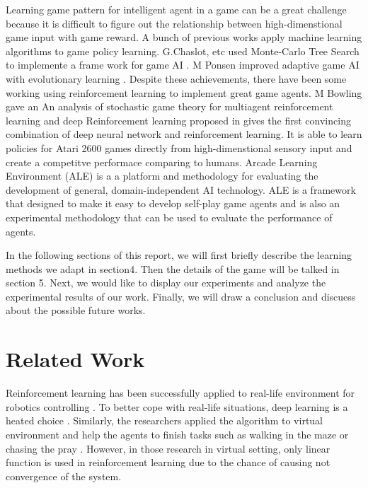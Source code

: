 \documentclass{acmsiggraph}
\begin{document}
Learning game pattern for intelligent agent in a game can be a great challenge because it is difficult to figure out the relationship between high-dimenstional game input with game reward. A bunch of previous works apply machine learning algorithms to game policy learning. G.Chaslot, etc used Monte-Carlo Tree Search to implemente a frame work for game AI \cite{chaslot2008monte}. M Ponsen improved  adaptive game AI with evolutionary learning \cite{ponsen2004improving}. Despite these achievements, there have been some working using reinforcement learning to implement great game agents. M Bowling gave an An analysis
of stochastic game theory for multiagent reinforcement learning \cite{bowling2002multiagent} and deep Reinforcement learning proposed in \cite{mnih2013playing} gives the first convincing combination of deep neural network and reinforcement learning. It is able to learn policies for Atari 2600 games directly from high-dimenstional sensory input and create a competitve performace comparing to humans.  Arcade Learning Environment (ALE) \cite{bellemare13arcade} is a a platform and methodology for evaluating the development of general, domain-independent AI technology. ALE is a framework that designed to make it easy to develop self-play game agents and is also an experimental methodology that can be used to evaluate the performance of agents. 

In the following sections of this report, we will first briefly describe the learning methods we adapt in section4. Then the details of the game will be talked in section 5. Next, we would like to display our experiments and analyze the experimental results of our work. Finally, we will draw a conclusion and discuess about the possible future works.


\section{Related Work}
Reinforcement learning has been successfully applied to real-life environment for robotics controlling \cite{kober2013survey,abbeel2007helicopter}. To better cope with real-life situations, deep learning is a heated choice \cite{chen2014door}. Similarly, the researchers applied the algorithm to virtual environment and help the agents to finish tasks such as walking in the maze or chasing the pray \cite{manteghi2015maze,olsen2015co}. However, in those research in virtual setting, only linear function is used in reinforcement learning due to the chance of causing not convergence of the system. 
\end{document}
